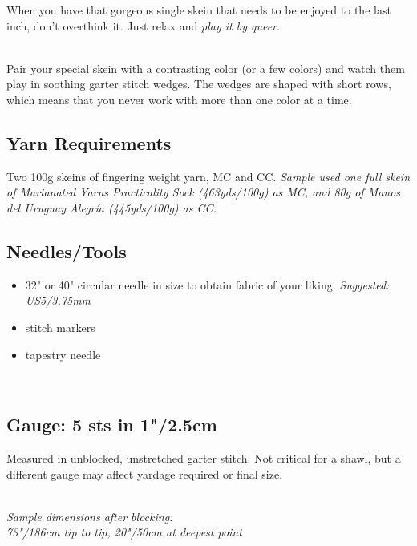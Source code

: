 \documentclass[12pt]{article}
\begin{document}
\begin{multicols}{2}
\small
When you have that gorgeous single skein that needs to be enjoyed to the last inch, don't overthink it. Just relax and \emph{play it by queer}. 

~\\
Pair your special skein with a contrasting color (or a few colors) and watch them play in soothing garter stitch wedges. The wedges are shaped with short rows, which means that you never work with more than one color at a time.

\subsection*{Yarn Requirements}

Two 100g skeins of fingering weight yarn, MC and CC. 
\emph{Sample used one full skein of Marianated Yarns Practicality Sock (463yds/100g) as MC, and 80g of Manos del Uruguay Alegr\'{i}a (445yds/100g) as CC.} %

\subsection*{Needles/Tools}

\begin{itemize}
\item 32" or 40" circular needle in size to obtain fabric of your liking. \emph{Suggested: US5/3.75mm} %
\item stitch markers
\item tapestry needle
\end{itemize}

\vfill ~\\
\columnbreak

\subsection*{Gauge: 5 sts in 1"/2.5cm}

Measured in unblocked, unstretched garter stitch. Not critical for a shawl, but a different gauge may affect yardage required or final size.

~\\
\emph{Sample dimensions after blocking: \\ 73"/186cm tip to tip, 20"/50cm at deepest point}



\end{multicols}
\end{document}
